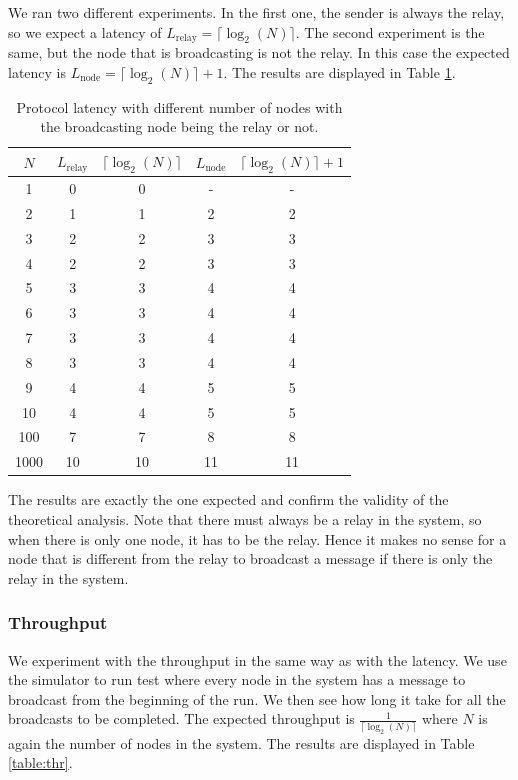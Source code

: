 \documentclass[a4paper]{article}
\begin{document}
We ran two different experiments. In the first one, the sender is always the
relay, so we expect a latency of $L_{\text{relay}} = \lceil\log_2(N)\rceil$.
The second experiment is the same, but the node that is broadcasting is not
the relay. In this case the expected latency is
$L_{\text{node}} = \lceil\log_2(N)\rceil + 1$. The results are displayed in
Table \ref{table:la}.

\begin{table}[H]
    \centering
    \begin{tabular}{|c|c|c|c|c|}
        \hline
        $N$  & $L_{\text{relay}}$ & $\lceil\log_2(N)\rceil$ & $L_{\text{node}}$ & $\lceil\log_2(N)\rceil + 1$ \\
        \hline
        1     & 0    & 0    & -    & -    \\
        2     & 1    & 1    & 2    & 2    \\
        3     & 2    & 2    & 3    & 3    \\
        4     & 2    & 2    & 3    & 3    \\
        5     & 3    & 3    & 4    & 4    \\
        6     & 3    & 3    & 4    & 4    \\
        7     & 3    & 3    & 4    & 4    \\
        8     & 3    & 3    & 4    & 4    \\
        9     & 4    & 4    & 5    & 5    \\
        10    & 4    & 4    & 5    & 5    \\
        100   & 7    & 7    & 8    & 8    \\
        1000  & 10   & 10   & 11   & 11   \\
        \hline
    \end{tabular}
    \caption{Protocol latency with different number of nodes with the broadcasting node being the relay or not.}
    \label{table:la}
\end{table}

The results are exactly the one expected and confirm the validity of the
theoretical analysis. Note that there must always be a relay in the system, so
when there is only one node, it has to be the relay. Hence it makes no sense
for a node that is different from the relay to broadcast a message if there is
only the relay in the system.

\subsubsection{Throughput}
We experiment with the throughput in the same way as with the latency. We use
the simulator to run test where every node in the system has a message to
broadcast from the beginning of the run. We then see how long it take for all
the broadcasts to be completed. The expected throughput is
$\frac{1}{\lceil\log_2(N)\rceil}$ where $N$ is again the number of nodes in
the system. The results are displayed in Table \ref{table:thr}.
\end{document}
